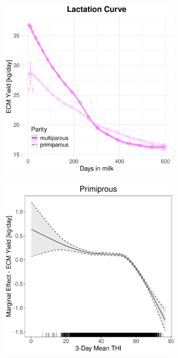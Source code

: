 \begin{figure}[H]
\begin{subfigure}[b]{0.45\textwidth}
        \includegraphics[width=\textwidth]{thesis/figures/models/ecm/full/sf_ecm_full/sf_ecm_full_marginal_dim_milk_combined.png}
    \end{subfigure}
    \begin{subfigure}[b]{0.45\textwidth}
        \centering
        \includegraphics[width=\textwidth]{thesis/figures/models/ecm/full/sf_ecm_full/sf_ecm_full_marginal_thi_milk_primi.png}

\end{subfigure}
\end{figure}
